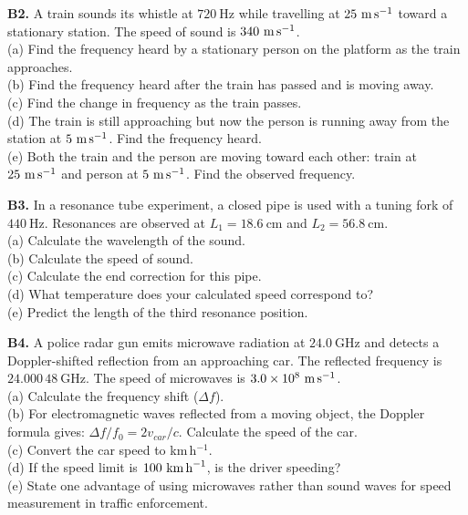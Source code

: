 \begin{exercisebox}[18]
\vspace{0.4cm}

\textbf{B2.} A train sounds its whistle at
$720\ \text{Hz}$ while travelling at
$25\ \text{m\,s}^{-1}$ toward a stationary
station. The speed of sound is $340\ \text{m\,s}^{-1}$.\\[4pt]
(a) Find the frequency heard by a stationary person
on the platform as the train approaches.\\
(b) Find the frequency heard after the train has
passed and is moving away.\\
(c) Find the change in frequency as the train passes.\\
(d) The train is still approaching but now the
person is running away from the station at
$5\ \text{m\,s}^{-1}$. Find the frequency heard.\\
(e) Both the train and the person are moving toward
each other: train at $25\ \text{m\,s}^{-1}$ and
person at $5\ \text{m\,s}^{-1}$. Find the observed
frequency.
\hfill{}

\vspace{0.4cm}

\textbf{B3.} In a resonance tube experiment, a
closed pipe is used with a tuning fork of
$440\ \text{Hz}$. Resonances are observed at
$L_1 = 18.6\ \text{cm}$ and $L_2 = 56.8\ \text{cm}$.\\[4pt]
(a) Calculate the wavelength of the sound.\\
(b) Calculate the speed of sound.\\
(c) Calculate the end correction for this pipe.\\
(d) What temperature does your calculated speed
correspond to?\\
(e) Predict the length of the third resonance
position.
\hfill{}

\vspace{0.4cm}

\textbf{B4.} A police radar gun emits microwave
radiation at $24.0\ \text{GHz}$ and detects a
Doppler-shifted reflection from an approaching car.
The reflected frequency is $24.000\,48\ \text{GHz}$.
The speed of microwaves is $3.0\times10^8\ \text{m\,s}^{-1}$.\\[4pt]
(a) Calculate the frequency shift ($\Delta f$).\\
(b) For electromagnetic waves reflected from a
moving object, the Doppler formula gives:
$\Delta f/f_0 = 2v_{car}/c$.
Calculate the speed of the car.\\
(c) Convert the car speed to km\,h$^{-1}$.\\
(d) If the speed limit is $100\ \text{km\,h}^{-1}$,
is the driver speeding?\\
(e) State one advantage of using microwaves rather
than sound waves for speed measurement in traffic
enforcement.
\hfill{}


\end{exercisebox}
